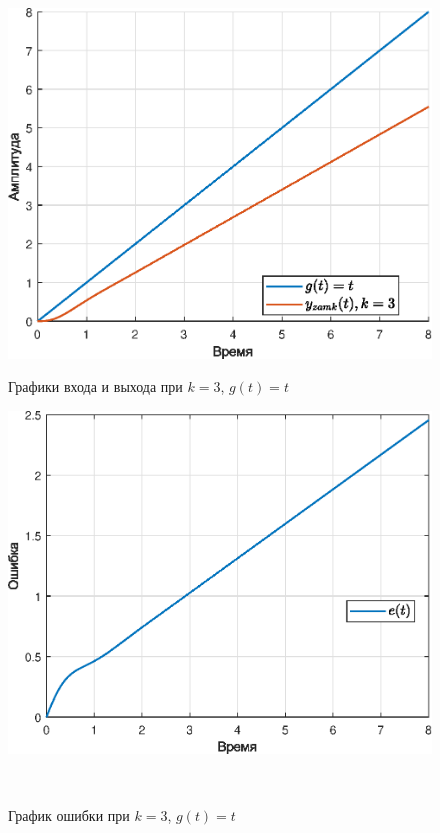 \documentclass[a4paper]{article}
\begin{document}
\begin{figure}[H]
    \begin{minipage}{0.5\textwidth}
        \centering \includegraphics[width=\textwidth]{ex3/k3_g_vt.eps}
        \caption{Графики входа и выхода при $k=3$, $g(t)=t$}
    \end{minipage}\hfill
    \begin{minipage}{0.5\textwidth}
        \centering \includegraphics[width=\textwidth]{ex3/k3_g_vt_error.eps}
        \caption{График ошибки при $k=3$, $g(t)=t$}
    \end{minipage}\\[1em]
\end{figure}\noindent\
\end{document}
